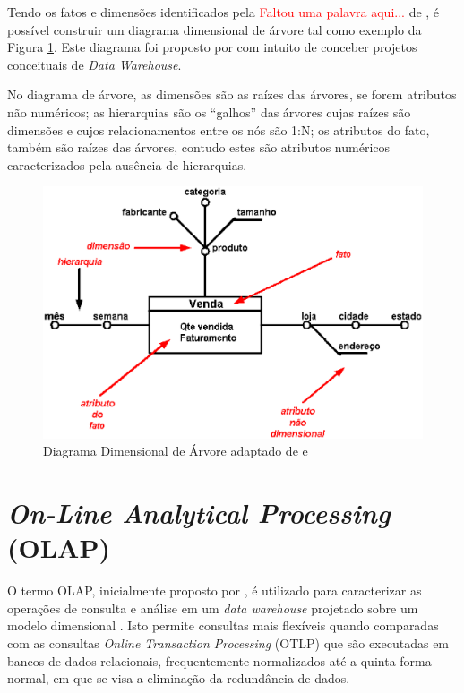 Tendo os fatos e dimensões identificados pela \textcolor{red}{Faltou uma palavra aqui...} de , é possível construir um diagrama dimensional de árvore tal como exemplo da Figura \ref{fig:tree}. Este diagrama foi proposto por  com intuito de conceber projetos conceituais de \textit{Data Warehouse}.  

\textcolor{red}{}

No diagrama de árvore, as dimensões são as raízes das árvores, se forem atributos não numéricos; as hierarquias são os “galhos” das árvores cujas raízes são dimensões e cujos relacionamentos entre os nós são 1:N; os atributos do fato, também são raízes das árvores, contudo estes são atributos numéricos caracterizados pela ausência de hierarquias.


\begin{figure}[ht!]
\centering
\includegraphics[keepaspectratio=true,scale=0.5]{figuras/arvore.eps}
\caption{Diagrama Dimensional de Árvore adaptado de  e }
\label{fig:tree}
\end{figure}
\FloatBarrier


\section{\textit{On-Line Analytical Processing} (OLAP)}

O termo OLAP, inicialmente proposto por , é utilizado para caracterizar as operações de consulta e análise em um \textit{data warehouse} projetado sobre um modelo dimensional \cite{Kimball2002}. Isto permite consultas mais flexíveis quando comparadas com as consultas \textit{Online Transaction Processing} (OTLP) que são executadas em bancos de dados relacionais, frequentemente normalizados até a quinta forma normal, em que se visa a eliminação da redundância de dados.

